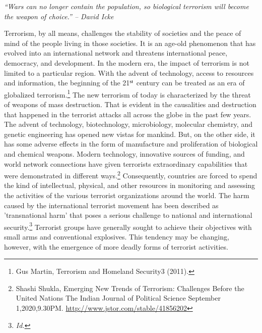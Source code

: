 \setcounter{figure}{0}
\setcounter{table}{0}
\setcounter{footnote}{0}



\begin{multicols}{2}

\noi
\textit{“Wars can no longer contain the population, so biological terrorism will become the
weapon of choice.” -- David Icke}


\noi
Terrorism, by all means, challenges the stability of societies and the peace of mind of the
people living in those societies. It is an age-old phenomenon that has evolved into an
international network and threatens international peace, democracy, and development. In the
modern era, the impact of terrorism is not limited to a particular region. With the advent of
technology, access to resources and information, the beginning of the 21$^{\rm st}$ century can be
treated as an era of globalized terrorism.\footnote{Gus Martin, Terrorism and Homeland Security3 (2011).}
 The new terrorism of today is characterized by the
threat of weapons of mass destruction. That is evident in the causalities and destruction that
happened in the terrorist attacks all across the globe in the past few years. The advent of
technology, biotechnology, microbiology, molecular chemistry, and genetic engineering has
opened new vistas for mankind. But, on the other side, it has some adverse effects in the form
of manufacture and proliferation of biological and chemical weapons. Modern technology,
innovative sources of funding, and world network connections have given terrorists
extraordinary capabilities that were demonstrated in different ways.\footnote{Shashi Shukla, Emerging New Trends of Terrorism: Challenges Before the United Nations The Indian Journal
of Political Science September 1,2020,9.30PM. \url{http://www.jstor.com/stable/41856202}}
 Consequently, countries
are forced to spend the kind of intellectual, physical, and other resources in monitoring and
assessing the activities of the various terrorist organizations around the world. The harm
caused by the international terrorist movement has been described as 'transnational harm' that
poses a serious challenge to national and international security.\footnote{\textit{Id.}}
Terrorist groups have
generally sought to achieve their objectives with small arms and conventional explosives.
This tendency may be changing, however, with the emergence of more deadly forms of
terrorist activities. 


\end{multicols}
